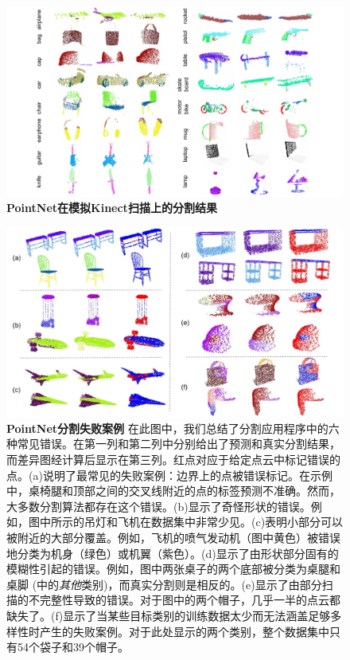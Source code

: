 \begin{figure}[t!]
\centering
\includegraphics[width=0.82\linewidth]{fig/part_seg_partial.pdf}
\caption{\textbf{PointNet在模拟Kinect扫描上的分割结果} }
\label{fig:part_seg_partial}
\end{figure}

\begin{figure}[t!]
\centering
\includegraphics[width=\linewidth]{fig/part_seg_failure.pdf}
\caption{\textbf{PointNet分割失败案例} 在此图中，我们总结了分割应用程序中的六种常见错误。在第一列和第二列中分别给出了预测和真实分割结果，而差异图经计算后显示在第三列。红点对应于给定点云中标记错误的点。(a)说明了最常见的失败案例：边界上的点被错误标记。在示例中，桌椅腿和顶部之间的交叉线附近的点的标签预测不准确。然而，大多数分割算法都存在这个错误。(b)显示了奇怪形状的错误。例如，图中所示的吊灯和飞机在数据集中非常少见。(c)表明小部分可以被附近的大部分覆盖。例如，飞机的喷气发动机（图中黄色）被错误地分类为机身（绿色）或机翼（紫色）。(d)显示了由形状部分固有的模糊性引起的错误。例如，图中两张桌子的两个底部被分类为桌腿和桌脚 (\cite{Yi16}中的\textit{其他}类别)，而真实分割则是相反的。(e)显示了由部分扫描的不完整性导致的错误。对于图中的两个帽子，几乎一半的点云都缺失了。(f)显示了当某些目标类别的训练数据太少而无法涵盖足够多样性时产生的失败案例。对于此处显示的两个类别，整个数据集中只有54个袋子和39个帽子。}
\label{fig:part_seg_failure}
\end{figure}

